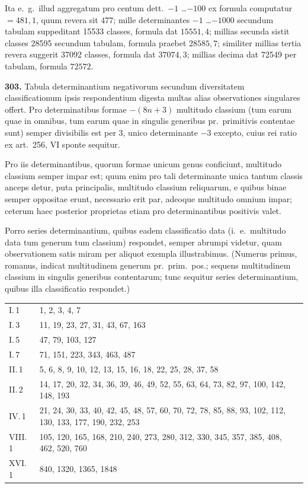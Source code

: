 \documentclass[12pt,a4paper]{article}
\theoremstyle{plain}
\theoremstyle{definition}
\theoremstyle{remark}
\begin{document}
Ita e.~g.~illud aggregatum pro centum dett.~$-1$ \ldots $-100$ ex formula computatur $= 481{,}1$, quum revera sit $477$; mille determinantes $-1$ \ldots $-1000$ secundum tabulam suppeditant 15533 classes, formula dat $15551{,}4$; millias secunda sistit classes 28595 secundum tabulam, formula praebet $28585{,}7$; similiter millias tertia revera suggerit 37092 classes, formula dat $37074{,}3$; millias decima dat 72549 per tabulam, formula $72572$.

\textbf{303.} Tabula determinantium negativorum secundum diversitatem classificationum ipsis respondentium digesta multas alias observationes singulares offert. Pro determinatibus formae $-(8n+3)$ multitudo classium (tum earum quae in omnibus, tum earum quae in singulis generibus pr.~primitivis contentae sunt) semper divisibilis est per 3, unico determinante $-3$ excepto, cuius rei ratio ex art.~256, VI sponte sequitur.

Pro iis determinantibus, quorum formae unicum genus conficiunt, multitudo classium semper impar est; quum enim pro tali determinante unica tantum classis anceps detur, puta principalis, multitudo classium reliquarum, e quibus binae semper oppositae erunt, necessario erit par, adeoque multitudo omnium impar; ceterum haec posterior proprietas etiam pro determinantibus positivis valet.

Porro series determinantium, quibus eadem classificatio data (i.~e.~multitudo data tum generum tum classium) respondet, semper abrumpi videtur, quam observationem satis miram per aliquot exempla illustrabimus. (Numerus primus, romanus, indicat multitudinem generum pr.~prim.~pos.; sequens multitudinem classium in singulis generibus contentarum; tunc sequitur series determinantium, quibus illa classificatio respondet.)

\begin{center}
\begin{tabular}{l@{\,\ldots\,}l}
I.\,1 & 1, 2, 3, 4, 7 \\
I.\,3 & 11, 19, 23, 27, 31, 43, 67, 163 \\
I.\,5 & 47, 79, 103, 127 \\
I.\,7 & 71, 151, 223, 343, 463, 487 \\
II.\,1 & 5, 6, 8, 9, 10, 12, 13, 15, 16, 18, 22, 25, 28, 37, 58 \\
II.\,2 & 14, 17, 20, 32, 34, 36, 39, 46, 49, 52, 55, 63, 64, 73, 82, 97, 100, 142, 148, 193 \\
IV.\,1 & 21, 24, 30, 33, 40, 42, 45, 48, 57, 60, 70, 72, 78, 85, 88, 93, 102, 112, 130, 133, 177, 190, 232, 253 \\
VIII.\,1 & 105, 120, 165, 168, 210, 240, 273, 280, 312, 330, 345, 357, 385, 408, 462, 520, 760 \\
XVI.\,1 & 840, 1320, 1365, 1848
\end{tabular}
\end{center}
\end{document}
